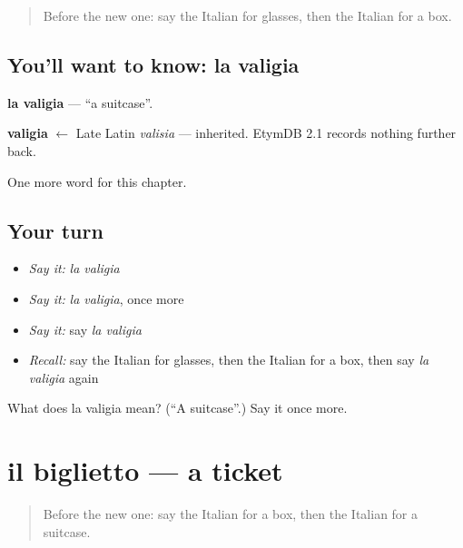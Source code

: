 \label{lesson:IT-C63-valigia}



\begin{quote}
Before the new one: say the Italian for glasses, then the Italian for a box.
\end{quote}

\subsection*{You'll want to know: la valigia}
\textbf{la valigia} — \textquotedblleft{}a suitcase\textquotedblright{}.

\begin{cousinweb}
\textbf{valigia} $\leftarrow$ Late Latin \emph{valisia} — inherited. EtymDB 2.1 records nothing further back.
\end{cousinweb}

\begin{grammarlens}[title={What you've built}]
One more word for this chapter.
\end{grammarlens}

\subsection*{Your turn}
\begin{itemize}
\raggedright
  \item \emph{Say it:} \emph{la valigia}
  \item \emph{Say it:} \emph{la valigia}, once more
  \item \emph{Say it:} say \emph{la valigia}
  \item \emph{Recall:} say the Italian for glasses, then the Italian for a box, then say \emph{la valigia} again
\end{itemize}

\begin{tcolorbox}[breakable,colback=teal!4,colframe=teal!35!black,title={Before you move on}]
What does la valigia mean? (\textquotedblleft{}A suitcase\textquotedblright{}.) Say it once more.
\end{tcolorbox}
\section[il biglietto]{il biglietto — a ticket}

\label{lesson:IT-C63-biglietto}



\begin{quote}
Before the new one: say the Italian for a box, then the Italian for a suitcase.
\end{quote}

